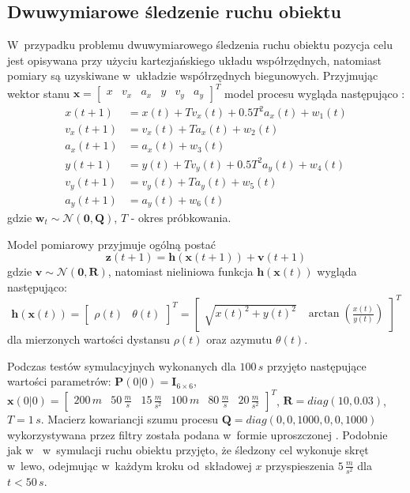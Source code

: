 \subsection{Dwuwymiarowe śledzenie ruchu obiektu}
\label{subsec:2D_target_tracking}
W~przypadku problemu dwuwymiarowego śledzenia ruchu obiektu pozycja celu jest opisywana przy użyciu kartezjańskiego układu współrzędnych, natomiast pomiary są uzyskiwane w~układzie współrzędnych biegunowych. Przyjmując wektor stanu $\boldsymbol{x}=\begin{bmatrix}
x & v_x & a_x & y & v_y & a_y
\end{bmatrix}^T$ model procesu wygląda następująco \cite{Konatowski_2D_Tracking}:
\begin{align}\label{eq:2D_tracking_process_model}
x(t+1) &= x(t)+Tv_x(t)+0.5T^2a_x(t)+w_1(t) \nonumber \\
v_x(t+1) &= v_x(t)+Ta_x(t)+w_2(t) \nonumber \\
a_x(t+1) &= a_x(t)+w_3(t) \nonumber \\
y(t+1) &= y(t)+Tv_y(t)+0.5T^2a_y(t)+w_4(t) \nonumber \\
v_y(t+1) &= v_y(t)+Ta_y(t)+w_5(t) \nonumber \\
a_y(t+1) &= a_y(t)+w_6(t)
\end{align}
gdzie $\boldsymbol{w}_t\sim\mathcal{N}(\boldsymbol{0}, \boldsymbol{Q})$, $T$ - okres próbkowania.\par
Model pomiarowy przyjmuje ogólną postać
\begin{equation}
\boldsymbol{z}(t+1) = \boldsymbol{h}(\boldsymbol{x}(t+1)) + \boldsymbol{v}(t+1)
\end{equation}
gdzie $\boldsymbol{v} \sim \mathcal{N}(\boldsymbol{0}, \boldsymbol{R})$, natomiast nieliniowa funkcja $\boldsymbol{h}(\boldsymbol{x}(t))$ wygląda następująco:
\begin{equation} 
\boldsymbol{h}(\boldsymbol{x}(t))=\begin{bmatrix}
\rho(t) & \theta(t)
\end{bmatrix}^T = \begin{bmatrix}
\sqrt{x(t)^2 + y(t)^2} & \arctan(\frac{x(t)}{y(t)})
\end{bmatrix}^T
\end{equation}
dla mierzonych wartości dystansu $\rho(t)$ oraz azymutu $\theta(t)$. \par
Podczas testów symulacyjnych wykonanych dla $100\,s$ przyjęto następujące wartości parametrów: $\boldsymbol{P}(0|0) = \boldsymbol{I}_{6 \times 6}$, $\boldsymbol{x}(0|0)=\begin{bmatrix}
200\,m & 50\,\frac{m}{s} & 15\,\frac{m}{s^2} & 100\,m & 80\,\frac{m}{s} & 20\,\frac{m}{s^2}
\end{bmatrix}^T$, $\boldsymbol{R}=diag(10, 0.03)$, $T=1\,s$. Macierz kowariancji szumu procesu $\boldsymbol{Q}=diag(0,0,1000,0,0,1000)$ wykorzystywana przez filtry została podana w~formie uproszczonej \cite[247]{labbe2014}. Podobnie jak w~\cite{Konatowski_2D_Tracking} w~symulacji ruchu obiektu przyjęto, że śledzony cel wykonuje skręt w~lewo, odejmując w~każdym kroku od~składowej $x$ przyspieszenia $5\,\frac{m}{s^2}$ dla $t<50\,s$. \par
